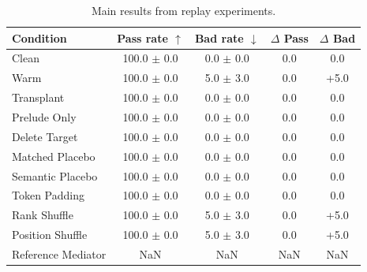 \begin{table}[t]
\centering\small\setlength{\tabcolsep}{4pt}
\begin{tabular}{lcccc}
\toprule
Condition & Pass rate $\uparrow$ & Bad rate $\downarrow$ & $\Delta$ Pass & $\Delta$ Bad \\
\midrule
Clean & 100.0 $\pm$ 0.0 & 0.0 $\pm$ 0.0 & 0.0 & 0.0 \\
Warm & 100.0 $\pm$ 0.0 & 5.0 $\pm$ 3.0 & 0.0 & +5.0 \\
Transplant & 100.0 $\pm$ 0.0 & 0.0 $\pm$ 0.0 & 0.0 & 0.0 \\
Prelude Only & 100.0 $\pm$ 0.0 & 0.0 $\pm$ 0.0 & 0.0 & 0.0 \\
Delete Target & 100.0 $\pm$ 0.0 & 0.0 $\pm$ 0.0 & 0.0 & 0.0 \\
Matched Placebo & 100.0 $\pm$ 0.0 & 0.0 $\pm$ 0.0 & 0.0 & 0.0 \\
Semantic Placebo & 100.0 $\pm$ 0.0 & 0.0 $\pm$ 0.0 & 0.0 & 0.0 \\
Token Padding & 100.0 $\pm$ 0.0 & 0.0 $\pm$ 0.0 & 0.0 & 0.0 \\
Rank Shuffle & 100.0 $\pm$ 0.0 & 5.0 $\pm$ 3.0 & 0.0 & +5.0 \\
Position Shuffle & 100.0 $\pm$ 0.0 & 5.0 $\pm$ 3.0 & 0.0 & +5.0 \\
Reference Mediator & NaN & NaN & NaN & NaN \\
\bottomrule
\end{tabular}
\caption{Main results from replay experiments.}
\label{tab:main}
\end{table}